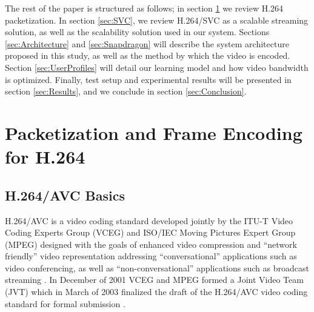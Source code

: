 \documentclass[3p,times,procedia]{elsarticle}
\begin{document}
The rest of the paper is structured as follows; in section \ref{sec:Packetization} we review H.264 packetization. In section \ref{sec:SVC}, we review H.264/SVC as a scalable streaming solution, as well as the scalability solution used in our system. Sections \ref{sec:Architecture} and \ref{sec:Snapdragon} will describe the system architecture proposed in this study, as well as the method by which the video is encoded. Section \ref{sec:UserProfiles} will detail our learning model and how video bandwidth is optimized. Finally, test setup and experimental results will be presented in section \ref{sec:Results}, and we conclude in section \ref{sec:Conclusion}.


\section{Packetization and Frame Encoding for H.264}
\label{sec:Packetization}

\subsection{H.264/AVC Basics}

H.264/AVC is a video coding standard developed jointly by the ITU-T Video Coding Experts Group (VCEG) and ISO/IEC Moving Pictures Expert Group (MPEG) designed with the goals of enhanced video compression and ``network friendly'' video representation addressing ``conversational'' applications such as video conferencing, as well as ``non-conversational'' applications such as broadcast streaming \cite{H264AVCOverview}. In December of 2001 VCEG and MPEG formed a Joint Video Team (JVT) which in March of 2003 finalized the draft of the H.264/AVC video coding standard for formal submission \cite{H264AVCOverview}. 
\end{document}
